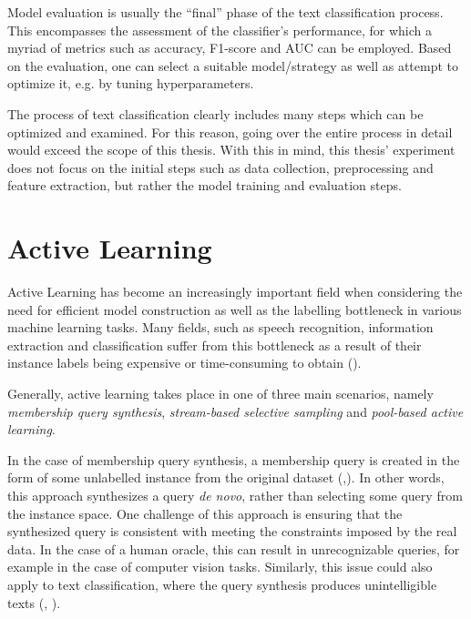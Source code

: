 \documentclass[english,bachelor,ul]{webisthesis} %
\begin{document}
Model evaluation is usually the ``final'' phase of the text classification process. This encompasses the assessment of the classifier's performance, for which a myriad of metrics such as accuracy, F1-score and AUC can be employed. Based on the evaluation, one can select a suitable model/strategy as well as attempt to optimize it, e.g. by tuning hyperparameters.

The process of text classification clearly includes many steps which can be optimized and examined. For this reason, going over the entire process in detail would exceed the scope of this thesis. With this in mind, this thesis' experiment does not focus on the initial steps such as data collection, preprocessing and feature extraction, but rather the model training and evaluation steps.


\section{Active Learning}

Active Learning has become an increasingly important field when considering the need for efficient model construction as well as the labelling bottleneck in various machine learning tasks. Many fields, such as speech recognition, information extraction and classification suffer from this bottleneck as a result of their instance labels being expensive or time-consuming to obtain (\cite{settles.tr09}). 

Generally, active learning takes place in one of three main scenarios, namely \textit{membership query synthesis}, \textit{stream-based selective sampling} and \textit{pool-based active learning}. 

In the case of membership query synthesis, a membership query is created in the form of some unlabelled instance from the original dataset (\cite{DBLP:journals/ml/Angluin87},\cite{DBLP:journals/ijon/WangHYL15}). In other words, this approach synthesizes a query \textit{de novo}, rather than selecting some query from the instance space. One challenge of this approach is ensuring that the synthesized query is consistent with meeting the constraints imposed by the real data. In the case of a human oracle, this can result in unrecognizable queries, for example in the case of computer vision tasks. Similarly, this issue could also apply to text classification, where the query synthesis produces unintelligible texts (\cite{langbaum92}, \cite{settles.tr09}).%
\end{document}
